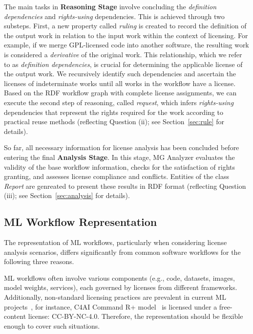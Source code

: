 The main tasks in \textbf{Reasoning Stage} involve concluding the \emph{definition dependencies} and \emph{rights-using} dependencies. 
This is achieved through two substeps.
First, a new property called \emph{ruling} is created to record the definition of the output work in relation to the input work within the context of licensing.
For example, if we merge GPL-licensed code into another software, the resulting work is considered a \emph{derivative} of the original work. 
This relationship, which we refer to as \emph{definition dependencies}, is crucial for determining the applicable license of the output work. 
We recursively identify such dependencies and ascertain the licenses of indeterminate works until all works in the workflow have a license.
Based on the RDF workflow graph with complete license assignments, we can execute the second step of reasoning, called \emph{request}, which infers \emph{rights-using} dependencies that represent the rights required for the work according to practical reuse methods (reflecting Question (ii); see Section~\ref{sec:rule} for details). 

So far, all necessary information for license analysis has been concluded before entering the final \textbf{Analysis Stage}. 
In this stage, MG Analyzer evaluates the validity of the base workflow information, checks for the satisfaction of rights granting, and assesses license compliance and conflicts. 
Entities of the class \emph{Report} are genreated to present these results in RDF format (reflecting Question (iii); see Section~\ref{sec:analysis} for details).

\subsection{ML Workflow Representation}
\label{sec:wf}
The representation of ML workflows, particularly when considering license analysis scenarios, differs significantly from common software workflows for the following three reasons.

 ML workflows often involve various components (e.g., code, datasets, images, model weights, services), each governed by licenses from different frameworks. 
Additionally, non-standard licensing practices are prevalent in current ML projects~\cite{rajbahadur2021can, duan2024modelgo}, for instance, C4AI Command R+ model~\cite{cohereforai2024c4ai} is licensed under a free-content license: CC-BY-NC-4.0. 
Therefore, the representation should be flexible enough to cover such situations.

